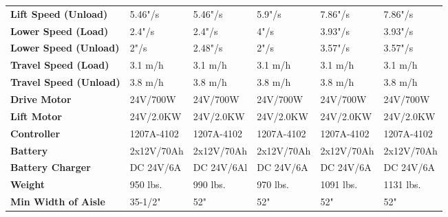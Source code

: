 \documentclass[11pt, a4paper]{article}
\begin{document}
\begin{table}[h!]
\begin{tabularx}{\textwidth}{>{\raggedright\arraybackslash\bfseries}p{4cm} X X X X X}
        Lift Speed (Unload) & 5.46"/s & 5.46"/s & 5.9"/s & 7.86"/s & 7.86"/s \\
        Lower Speed (Load) & 2.4"/s & 2.4"/s & 4"/s & 3.93"/s & 3.93"/s \\
        Lower Speed (Unload) & 2"/s & 2.48"/s & 2"/s & 3.57"/s & 3.57"/s \\
        Travel Speed (Load) & 3.1 m/h & 3.1 m/h & 3.1 m/h & 3.1 m/h & 3.1 m/h \\
        Travel Speed (Unload) & 3.8 m/h & 3.8 m/h & 3.8 m/h & 3.8 m/h & 3.8 m/h \\
        Drive Motor & 24V/700W & 24V/700W & 24V/700W & 24V/700W & 24V/700W \\
        Lift Motor & 24V/2.0KW & 24V/2.0KW & 24V/2.0KW & 24V/2.0KW & 24V/2.0KW \\
        Controller & 1207A-4102 & 1207A-4102 & 1207A-4102 & 1207A-4102 & 1207A-4102 \\
        Battery & 2x12V/70Ah & 2x12V/70Ah & 2x12V/70Ah & 2x12V/70Ah & 2x12V/70Ah \\
        Battery Charger & DC 24V/6A & DC 24V/6Al & DC 24V/6A & DC 24V/6A & DC 24V/6A \\
        Weight & 950 lbs. & 990 lbs. & 970 lbs. & 1091 lbs. & 1131 lbs. \\
        Min Width of Aisle & 35-1/2" & 52" & 52" & 52" & 52" \\
        \bottomrule
    \end{tabularx}
\end{table}
\end{document}
